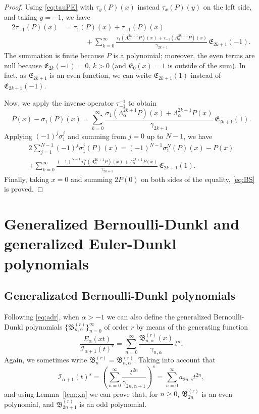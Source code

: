 \documentclass[10pt]{article}
\theoremstyle{plain}
\theoremstyle{definition}
\numberwithin{equation}{section} %
\newcommand{\Ea}{E_{\alpha}}
\newcommand{\La}{\Lambda_{\alpha}}
\newcommand{\I}{\mathcal{I}}
\newcommand{\B}{\mathfrak{B}}
\newcommand{\E}{\mathfrak{E}}
\newcommand{\cc}{\gamma}
\begin{document}
\begin{proof}
Using \eqref{eq:tauPE} with $\tau_y(P)(x)$ instead $\tau_x(P)(y)$ on the left side, and taking $y=-1$, we have
\begin{align*}
  2\tau_{-1}(P)(x) &= \tau_1(P)(x)+\tau_{-1}(P)(x) \\
  &\qquad\quad + \sum_{k=0}^{\infty}\frac{\tau_1(\La^{2k+1} P)(x) 
    + \tau_{-1} (\La^{2k+1} P)(x)}{\cc_{2k+1}} \, \E_{2k+1}(-1).
\end{align*} 
The summation is finite because $P$ is a polynomial; moreover, the even terms are null because $\E_{2k}(-1)=0$, $k>0$
(and $\E_0(x)=1$ is outside of the sum). In fact, as $\E_{2k+1}$ is an even function, we can write $\E_{2k+1}(1)$ instead of $\E_{2k+1}(-1)$.

Now, we apply the inverse operator $\tau_{-1}^{-1}$ to obtain
\[
  P(x)-\sigma_1(P)(x) = \sum_{k=0}^{\infty} \frac{\sigma_1(\La^{2k+1} P)(x) 
    + \La^{2k+1} P(x)}{\cc_{2k+1}} \, \E_{2k+1}(1).
\]
Applying $(-1)^j\sigma_1^j$ and summing from $j=0$ up to $N-1$, we have 
\begin{multline*}
  2\sum_{j=1}^{N-1}(-1)^{j}\sigma_1^j(P)(x) = (-1)^{N-1}\sigma_1^N(P)(x)-P(x) \\ 
  + \sum_{k=0}^{\infty} \frac{(-1)^{N-1}\sigma_1^N(\La^{2k+1} P)(x)
  + \La^{2k+1} P(x)}{\cc_{2k+1}}\,\E_{2k+1}(1).
\end{multline*}
Finally, taking $x=0$ and summing $2P(0)$ on both sides of the equality, \eqref{eq:BS} is proved.
\end{proof}

\section{Generalized Bernoulli-Dunkl and generalized Euler-Dunkl polynomials}
\label{sec:Gen-BE-D}

\subsection{Generalizated Bernoulli-Dunkl polynomials}

Following \eqref{eq:adr}, when $\alpha>-1$ we can also define the generalized Bernoulli-Dunkl polynomials $\{\B_{n,\alpha}^{(r)}\}_{n=0}^{\infty}$ of order $r$ by means of the generating function
\begin{equation}
\label{eq:defbdr}
  \frac{\Ea(xt)}{\I_{\alpha+1}(t)^r}
  = \sum_{n=0}^\infty \frac{\B_{n,\alpha}^{(r)}(x)}{\cc_{n,\alpha}}\,t^n.
\end{equation}
Again, we sometimes write $\B_n^{(r)}=\B_{n,\alpha}^{(r)}$.
Taking into account that
\[
  \I_{\alpha +1}(t)^s = \left(\sum_{n=0}^{\infty}\frac{t^{2n}}{\cc_{2n,\alpha+1}}\right)^s
  = \sum_{n=0}^{\infty}a_{2n,s}t^{2n},
\]
and using Lemma~\ref{lem:xn} we can prove that, for $n\ge 0$, $\B_{2n}^{(r)}$ is an even polynomial, and $\B_{2n+1}^{(r)}$ is an odd polynomial.
\end{document}
